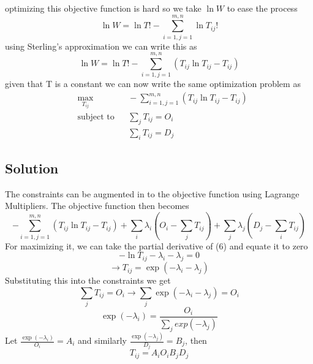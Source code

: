 \documentclass[12pt]{article}
\begin{document}
optimizing this objective function is hard so we take $\ln{W}$ to ease the process
    \begin{equation}
        \ln{W} = \ln{T!} - \sum_{i=1,j=1}^{m,n}\ln{T_{ij}}!
    \end{equation}
using Sterling's approximation we can write this as
    \begin{equation}
        \ln{W} = \ln{T!} - \sum_{i=1,j=1}^{m,n}(T_{ij}\ln{T_{ij}} - T_{ij})
    \end{equation}
given that T is a constant we can now write the same optimization problem as
    \begin{equation*}
    \begin{aligned}
    & \underset{T_{ij}}{\text{max}}
    & & \mathrm{}-\sum_{i=1,j=1}^{m,n}(T_{ij}\ln{T_{ij}} - T_{ij}) \\
    & \text{subject to}
    & &  \sum_{j}T_{ij} = O_{i}\\
    &&& \sum_{i}T_{ij} = D_{j}
    \end{aligned}
    \end{equation*}

\newpage

\subsection{Solution}
The constraints can be augmented in to the objective function using Lagrange Multipliers. The objective function then becomes
    \begin{equation}
        -\sum_{i=1,j=1}^{m,n}(T_{ij}\ln{T_{ij}} - T_{ij}) + \sum_{i}\lambda_{i}(O_{i} - \sum_{j}T_{ij}) + \sum_{j}\lambda_{j}(D_{j} - \sum_{i}T_{ij})
    \end{equation}
For maximizing it, we can take the partial derivative of (6) and equate it to zero
    \begin{equation}
        -\ln{T_{ij}} - \lambda_{i} - \lambda_{j} = 0
    \end{equation}
    \begin{equation}
        \longrightarrow T_{ij} = \exp{(-\lambda_{i}-\lambda_{j})}
    \end{equation}
Substituting this into the constraints we get
    \begin{equation}
        \sum_{j}T_{ij} = O_{i} \longrightarrow \sum_{j}\exp{(-\lambda_{i}-\lambda_{j})} = O_{i}
    \end{equation}
    \begin{equation}
        \exp{(-\lambda_{i})} = \frac{O_{i}}{\sum_{j}exp{(-\lambda_{j})}}
    \end{equation}
Let $\frac{\exp{(-\lambda_{i})}}{{O_{i}}} = A_{i}$ and similarly $\frac{\exp{(-\lambda_{j})}}{{{D_{j}}}} = B_{j}$, then 
    \begin{equation}
        T_{ij} = A_{i}O_{i}B_{j}D_{j}
    \end{equation}
\end{document}
